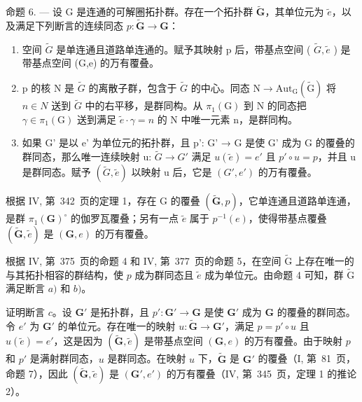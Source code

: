 命题 6. --- 设 G 是连通的可解圈拓扑群。存在一个拓扑群 \(\widetilde{\mathbf{G}}\)，其单位元为 \(\widetilde{e}\)，以及满足下列断言的连续同态 \(p\colon \widetilde{\mathbf{G}}\to \mathbf{G}\)：

\begin{enumerate}
\def\labelenumi{\alph{enumi})}
\item
  空间 \(\widetilde{G}\) 是单连通且道路单连通的。赋予其映射 p 后，带基点空间 ( \(\widetilde{G},\widetilde{e}\) ) 是带基点空间 (G,e) 的万有覆叠。
\item
  p 的核 N 是 \(\widetilde{G}\) 的离散子群，包含于 \(\widetilde{G}\) 的中心。同态 \(\mathrm{N}\to\mathrm{Aut}_{\mathrm{G}}(\widetilde{\mathrm{G}})\) 将 \(n\in N\) 送到 \(\widetilde{G}\) 中的右平移，是群同构。从 \(\pi_{1}(\mathrm{G})\) 到 N 的同态把 \(\gamma\in\pi_{1}(\mathrm{G})\) 送到满足 \(\widetilde{e}\cdot\gamma=n\) 的 N 中唯一元素 n，是群同构。
\item
  如果 G' 是以 e' 为单位元的拓扑群，且 p': G' → G 是使 G' 成为 G 的覆叠的群同态，那么唯一连续映射 u: \(\widetilde{G} \rightarrow G'\) 满足 \(u(\widetilde{e}) = e'\) 且 \(p' \circ u = p\)，并且 u 是群同态。赋予 \((\widetilde{G}, \widetilde{e})\) 以映射 u 后，它是 \((G', e')\) 的万有覆叠。
\end{enumerate}

根据 IV, 第~342~页的定理 1，存在 G 的覆叠 \((\widetilde{\mathbf{G}},p)\)，它单连通且道路单连通，是群 \(\pi_1(\mathbf{G})^\circ\) 的伽罗瓦覆叠；另有一点 \(\widetilde{e}\) 属于 \(p^{-1}(e)\)，使得带基点覆叠 \((\widetilde{\mathbf{G}},\widetilde{e})\) 是 \((\mathbf{G},e)\) 的万有覆叠。

根据 IV, 第~375~页的命题 4 和 IV, 第~377~页的命题 5，在空间 \(\widetilde{\mathrm{G}}\) 上存在唯一的与其拓扑相容的群结构，使 \(p\) 成为群同态且 \(\widetilde{e}\) 成为单位元。由命题 4 可知，群 \(\widetilde{\mathrm{G}}\) 满足断言 \(a)\) 和 \(b)\)。

证明断言 \(c\)。设 \(\mathbf{G}'\) 是拓扑群，且 \(p'\colon \mathbf{G}' \to \mathbf{G}\) 是使 \(\mathbf{G}'\) 成为 \(\mathbf{G}\) 的覆叠的群同态。令 \(e'\) 为 \(\mathbf{G}'\) 的单位元。存在唯一的映射 \(u\colon \widetilde{\mathbf{G}} \to \mathbf{G}'\)，满足 \(p = p' \circ u\) 且 \(u(\widetilde{e}) = e'\)，这是因为 \((\widetilde{\mathbf{G}}, \widetilde{e})\) 是带基点空间 \((\mathbf{G}, e)\) 的万有覆叠。由于映射 \(p\) 和 \(p'\) 是满射群同态，\(u\) 是群同态。在映射 \(u\) 下，\(\widetilde{\mathbf{G}}\) 是 \(\mathbf{G}'\) 的覆叠（I, 第~81~页，命题 7），因此 \((\widetilde{\mathbf{G}}, \widetilde{e})\) 是 \((\mathbf{G}', e')\) 的万有覆叠（IV, 第~345~页，定理 1 的推论 2）。

